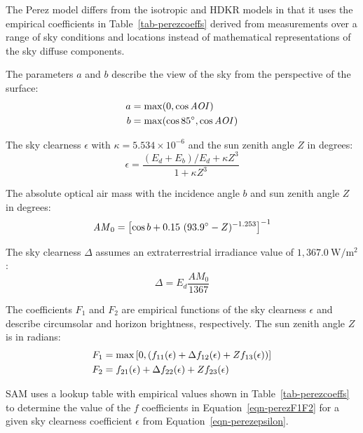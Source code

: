 \documentclass[12pt,letterpaper]{article}
\newcommand\AOI{\ensuremath{\mathit{AOI}}}
\begin{document}
The Perez model differs from the isotropic and HDKR models in that it uses the empirical  coefficients in Table~\ref{tab-perezcoeffs} derived from measurements over a range of sky conditions and locations instead of mathematical representations of the sky diffuse components.

The parameters $a$ and $b$ describe the view of the sky from the perspective of the surface:
\begin{align}
a &= \max( 0, \cos\AOI ) \notag\\
b & =\max( \cos85\degree, \cos\AOI) 
\end{align}

The sky clearness $\epsilon$ with $\kappa=5.534\times10^{-6}$ and the sun zenith angle
 $Z$ in degrees:
\begin{equation}\label{eqn-perezepsilon}
\epsilon =\frac{(E_d + E_b ) / E_d + \kappa Z^{3} }{1 +  \kappa Z^{3}}
\end{equation}

The absolute optical air mass with the incidence angle $b$ and sun zenith angle $Z$ in degrees:
\begin{equation}\label{eqn-perezam}
\mathit{AM}_0 = \left[ \cos b + 0.15~( 93.9\degree - Z )^{-1.253} \right]^{-1}
\end{equation}

The sky clearness $\Delta$ assumes an extraterrestrial irradiance value of $1,367.0~\mathrm{W/m^2}$:
\begin{equation}
\Delta = E_d \frac{\mathit{AM}_0}{1367}
\end{equation}

The coefficients $F_1$ and $F_2$ are empirical functions of the sky clearness $\epsilon$ and describe circumsolar and horizon brightness, respectively. The sun zenith angle $Z$ is in radians:
\begin{align}\label{eqn-perezF1F2}
F_1 & = \max \left[ 0,  \left( f_{\mathrm{11}}(\epsilon) + \Delta f_{\mathrm{12}}(\epsilon) + Z f_{\mathrm{13}}(\epsilon) \right) \right ] \notag\\
F_2 &= f_{\mathrm{21}}(\epsilon) + \Delta f_{\mathrm{22}}(\epsilon) + Z f_{\mathrm{23}}(\epsilon)
\end{align}

SAM uses a lookup table with empirical values shown in Table~\ref{tab-perezcoeffs} to determine the value of the $f$ coefficients in Equation~\ref{eqn-perezF1F2} for a given sky clearness coefficient $\epsilon$ from Equation~\ref{eqn-perezepsilon}.
\end{document}
